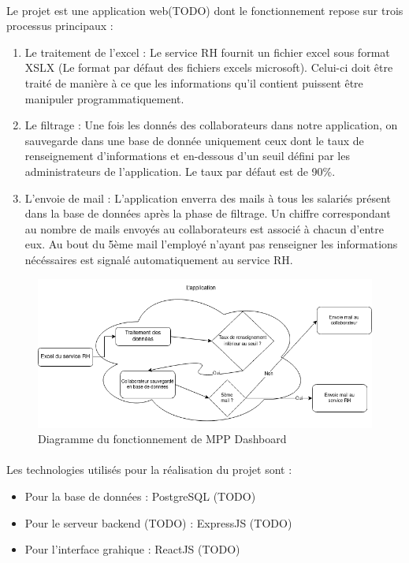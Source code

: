 \documentclass[12pt]{article}
\begin{document}
\begin {sloppypar}
\paragraph {} 
Le projet est une application web(TODO) dont le fonctionnement repose sur trois processus
principaux : 
\begin {enumerate}
  \item 
    Le traitement de l'excel : Le service RH fournit un fichier excel sous format XSLX 
    (Le format par défaut des fichiers excels microsoft). Celui-ci doit être traité de 
    manière à ce que les informations qu'il contient puissent être manipuler 
    programmatiquement.
  \item 
    Le filtrage : Une fois les donnés des collaborateurs dans notre application, on
    sauvegarde dans une base de donnée uniquement ceux dont le taux de renseignement 
    d'informations et en-dessous d'un seuil défini par les administrateurs de 
    l'application. Le taux par défaut est de 90\%. 
  \item 
    L'envoie de mail : L'application enverra des mails à tous les salariés présent 
    dans la base de données après la phase de filtrage. Un chiffre correspondant au nombre
    de mails envoyés au collaborateurs est associé à chacun d'entre eux. Au bout du 
    5ème mail l'employé n'ayant pas renseigner les informations nécéssaires est signalé 
    automatiquement au service RH.
\end{enumerate}
\newpage
\begin{figure}
  \includegraphics[width=\textwidth] {mpp-diagram.png}
  \caption {Diagramme du fonctionnement de MPP Dashboard}
\end{figure}
\paragraph {}
Les technologies utilisés pour la réalisation du projet sont : 
\begin {itemize}
\item   
  Pour la base de données : PostgreSQL (TODO)
\item 
  Pour le serveur backend (TODO) : ExpressJS (TODO)
\item 
  Pour l'interface grahique : ReactJS (TODO)
\end {itemize}


\end{sloppypar}
\end{document}
